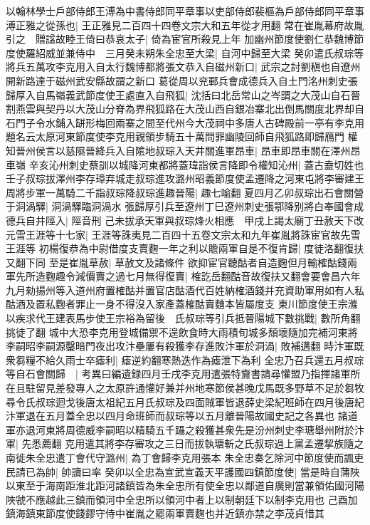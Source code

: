 以翰林學士戶部侍郎王溥為中書侍郎同平章事以吏部侍郎裴樞為戶部侍郎同平章事溥正雅之從孫也|{
	王正雅見二百四十四卷文宗大和五年從才用翻}
常在崔胤幕府故胤引之　贈諡故睦王倚曰恭哀太子|{
	倚為宦官所殺見上年}
加幽州節度使劉仁恭魏博節度使羅紹威並兼侍中　三月癸未朔朱全忠至大梁|{
	自河中歸至大梁}
癸卯遣氏叔琮等將兵五萬攻李克用入自太行魏博都將張文恭入自磁州新口|{
	武宗之討劉稹也自遼州開新路達于磁州武安縣故謂之新口}
葛從周以兖鄆兵會成德兵入自土門洺州刺史張歸厚入自馬嶺義武節度使王處直入自飛狐|{
	沈括曰北岳常山之岑謂之大茂山自石晉割燕雲與契丹以大茂山分脊為界飛狐路在大茂山西自銀冶寨北出倒馬關度北界却自石門子令水鋪入缾形梅回兩寨之間至代州今大茂祠中多唐人古碑殿前一亭有李克用題名云太原河東節度使李克用親領步騎五十萬問罪幽陵回師自飛狐路即歸鴈門}
權知晉州侯言以慈隰晉絳兵入自隂地叔琮入天井關進軍昂車|{
	昂車即昂車關在澤州昂車嶺}
辛亥沁州刺史蔡訓以城降河東都將蓋瑋詣侯言降即令權知沁州|{
	蓋古盍切姓也}
壬子叔琮拔澤州李存璋弃城走叔琮進攻潞州昭義節度使孟遷降之河東屯將李審建王周將步軍一萬騎二千詣叔琮降叔琮進趣晉陽|{
	趣七喻翻}
夏四月乙卯叔琮出石會關營于洞渦驛|{
	洞渦驛臨洞渦水}
張歸厚引兵至遼州丁巳遼州刺史張鄂降别將白奉國會成德兵自井陘入|{
	陘音刑}
己未拔承天軍與叔琮烽火相應　甲戌上謁太廟丁丑赦天下改元雪王涯等十七家|{
	王涯等誅夷見二百四十五卷文宗太和九年崔胤將誅宦官故先雪王涯等}
初楊復恭為中尉借度支賣麴一年之利以贍兩軍自是不復肯歸|{
	度徒洛翻復扶又翻下同}
至是崔胤草赦|{
	草赦文及諸條件}
欲抑宦官聽酤者自造麴但月輸榷酤錢兩軍先所造麴趣令減價賣之過七月無得復賣|{
	榷訖岳翻酤音故復扶又翻會要會昌六年九月勑揚州等入道州府置榷酤并置官店酤酒代百姓納榷酒錢并充資助軍用如有人私酤酒及置私麴者罪止一身不得沒入家產蓋榷酤賣麯本皆屬度支}
東川節度使王宗滌以疾求代王建表馬步使王宗裕為留後　氏叔琮等引兵抵晉陽城下數挑戰|{
	數所角翻挑徒了翻}
城中大恐李克用登城備禦不遑飲食時大雨積旬城多頹壞隨加完補河東將李嗣昭李嗣源鑿暗門夜出攻汴壘屢有殺獲李存進敗汴軍於洞渦|{
	敗補邁翻}
時汴軍既衆芻糧不給久雨士卒瘧利|{
	瘧逆約翻寒熱迭作為瘧泄下為利}
全忠乃召兵還五月叔琮等自石會關歸　|{
	考異曰編遺録四月壬戌李克用遣張特齎書請尋懽盟乃指揮諸軍所在且駐留見差發專人之太原許通懽好兼并州地寒節侯甚晚戊馬既多野草不足於芻牧尋令氏叔琮迴戈後唐太祖紀五月氏叔琮及四面賊軍皆退薛史梁紀班師在四月後唐紀汴軍退在五月蓋全忠以四月命班師而叔琮等以五月離晉陽故國史記之各異也}
諸道軍亦退河東將周德威李嗣昭以精騎五千躡之殺獲甚衆先是汾州刺史李瑭舉州附於汴軍|{
	先悉薦翻}
克用遣其將李存審攻之三日而拔執瑭斬之氏叔琮過上黨孟遷挈族隨之南徙朱全忠遣丁會代守潞州|{
	為丁會歸李克用張本}
朱全忠奏乞除河中節度使而諷吏民請已為帥|{
	帥讀曰率}
癸卯以全忠為宣武宣義天平護國四鎮節度使|{
	當是時自蒲陜以東至于海南距淮北距河諸鎮皆為朱全忠所有使全忠以鄰道自廣則當兼領佑國河陽陜虢不應越此三鎮而領河中全忠所以領河中者上以制朝廷下以制李克用也}
己酉加鎮海鎮東節度使錢鏐守侍中崔胤之罷兩軍賣麴也并近鎮亦禁之李茂貞惜其

